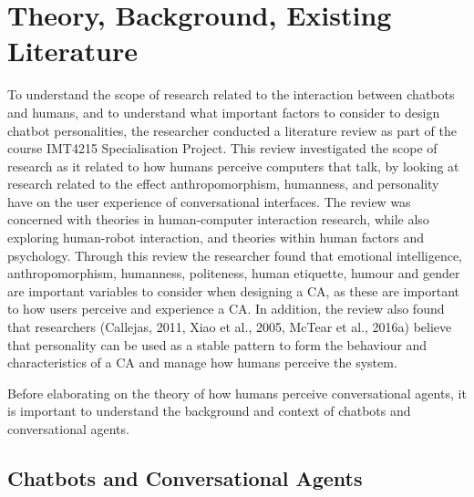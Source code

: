 \chapter{Theory, Background, Existing Literature}
\label{chap:background}

To understand the scope of research related to the interaction between chatbots and humans, and to understand what important factors to consider to design chatbot personalities, the researcher conducted a literature review as part of the course IMT4215 Specialisation Project. This review investigated the scope of research as it related to how humans perceive computers that talk, by looking at research related to the effect anthropomorphism, humanness, and personality have on the user experience of conversational interfaces. The review was concerned with theories in human-computer interaction research, while also exploring human-robot interaction, and theories within human factors and psychology. Through this review the researcher found that emotional intelligence, anthropomorphism, humanness, politeness, human etiquette, humour and gender are important variables to consider when designing a CA, as these are important to how users perceive and experience a CA. In addition, the review also found that researchers \citep{callejas2011,Xiao2005,McTear2016a} (Callejas, 2011, Xiao et al., 2005, McTear et al., 2016a) believe that personality can be used as a stable pattern to form the behaviour and characteristics of a CA and manage how humans perceive the system. 

Before elaborating on the theory of how humans perceive conversational agents, it is important to understand the background and context of chatbots and conversational agents.

\vspace{5mm} %

\section{Chatbots and Conversational Agents}

